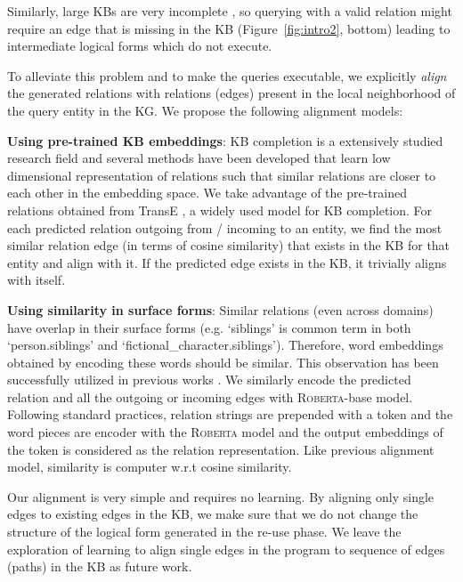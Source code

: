 \documentclass{article}
\newcommand{\roberta}{\textsc{Roberta}\xspace}
\begin{document}
Similarly, large KBs are very incomplete \cite{min2013distant}, so querying with a valid relation might require an edge that is missing in the KB (Figure~\ref{fig:intro2}, bottom) leading to intermediate logical forms which do not execute.

To alleviate this problem and to make the queries executable, we explicitly \emph{align} the generated relations with relations (edges) present in the local neighborhood of the query entity in the KG. We propose the following alignment models:

\textbf{Using pre-trained KB embeddings}: KB completion is a extensively studied research field \cite{nickel2011three,bordes2013translating,socher2013reasoning,Velickovic2018GraphAN,sun2019rotate} and several methods have been developed that learn low dimensional representation of relations such that similar relations are closer to each other in the embedding space. We take advantage of the pre-trained relations obtained from TransE \cite{bordes2013translating}, a widely used model for KB completion. For each predicted relation outgoing from / incoming to an entity, we find the most similar relation edge (in terms of cosine similarity) that exists in the KB for that entity and align with it. If the predicted edge exists in the KB, it trivially aligns with itself.

\textbf{Using similarity in surface forms}: Similar relations (even across domains) have overlap in their surface forms (e.g. `\textsf{siblings}' is common term in both `\textsf{person.siblings}' and `\textsf{fictional\_character.siblings}'). Therefore, word embeddings obtained by encoding these words should be similar. This observation has been successfully utilized in previous works \cite{toutanova-chen-2015-observed,hwang2019comprehensive}. We similarly encode the predicted relation and all the outgoing or incoming edges with \roberta-base model. Following standard practices, relation strings are prepended with a  token and the word pieces are encoder with the \roberta model and the output embeddings of the  token is considered as the relation representation. Like previous alignment model, similarity is computer w.r.t cosine similarity.

Our alignment is very simple and requires no learning. By aligning only single edges to existing edges in the KB, we make sure that we do not change the structure of the logical form generated in the re-use phase. We leave the exploration of learning to align single edges in the program to sequence of edges (paths) in the KB as future work. 
\end{document}
